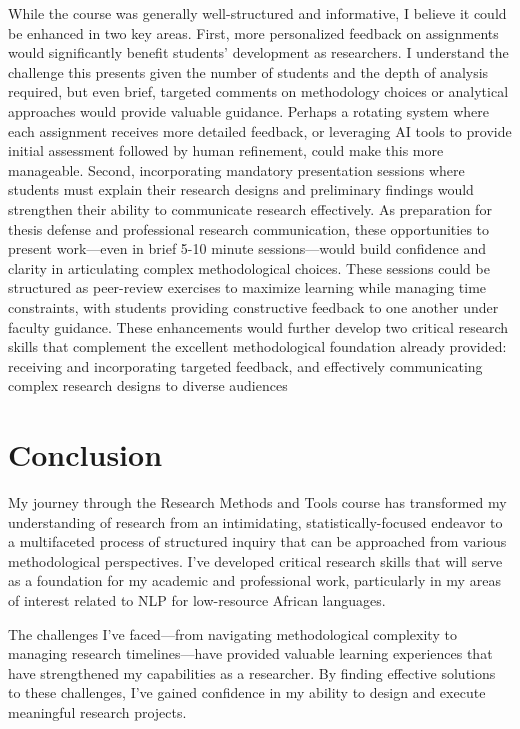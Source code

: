 \documentclass[
]{article}
\begin{document}
While the course was generally well-structured and informative, I
believe it could be enhanced in two key areas. First, more personalized
feedback on assignments would significantly benefit students'
development as researchers. I understand the challenge this presents
given the number of students and the depth of analysis required, but
even brief, targeted comments on methodology choices or analytical
approaches would provide valuable guidance. Perhaps a rotating system
where each assignment receives more detailed feedback, or leveraging AI
tools to provide initial assessment followed by human refinement, could
make this more manageable. Second, incorporating mandatory presentation
sessions where students must explain their research designs and
preliminary findings would strengthen their ability to communicate
research effectively. As preparation for thesis defense and professional
research communication, these opportunities to present work---even in
brief 5-10 minute sessions---would build confidence and clarity in
articulating complex methodological choices. These sessions could be
structured as peer-review exercises to maximize learning while managing
time constraints, with students providing constructive feedback to one
another under faculty guidance. These enhancements would further develop
two critical research skills that complement the excellent
methodological foundation already provided: receiving and incorporating
targeted feedback, and effectively communicating complex research
designs to diverse audiences

\section{Conclusion}\label{conclusion}

My journey through the Research Methods and Tools course has transformed
my understanding of research from an intimidating, statistically-focused
endeavor to a multifaceted process of structured inquiry that can be
approached from various methodological perspectives. I've developed
critical research skills that will serve as a foundation for my academic
and professional work, particularly in my areas of interest related to
NLP for low-resource African languages.

The challenges I've faced---from navigating methodological complexity to
managing research timelines---have provided valuable learning
experiences that have strengthened my capabilities as a researcher. By
finding effective solutions to these challenges, I've gained confidence
in my ability to design and execute meaningful research projects.
\end{document}
